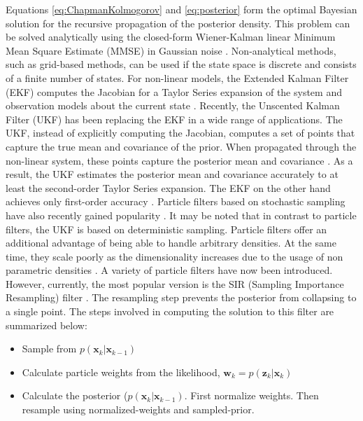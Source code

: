 \documentclass[12pt,letterpaper,doublespaced,ETD,proposal]{gt-ece-thesis}
\begin{document}
\begin{Body}
Equations \ref{eq:ChapmanKolmogorov} and \ref{eq:posterior} form the optimal Bayesian solution for the recursive propagation of the posterior density.  This problem can be solved analytically using the closed-form Wiener-Kalman linear Minimum Mean Square Estimate (MMSE) in Gaussian noise \cite{1964_JNL_BayesianEstimation_Ho, 1993_BOOK_SSP_Kay}.  Non-analytical methods, such as grid-based methods, can be used if the state space is discrete and consists of a finite number of states.  For non-linear models, the Extended Kalman Filter (EKF) computes the Jacobian for a Taylor Series expansion of the system and observation models about the current state \cite{2005_Misc_KalmanFilterComparison_Orderud}.  Recently, the Unscented Kalman Filter (UKF) has been replacing the EKF in a wide range of applications.  The UKF, instead of explicitly computing the Jacobian, computes a set of points that capture the true mean and covariance of the prior.  When propagated through the non-linear system, these points capture the posterior mean and covariance \cite{1997_CNF_UKF_Julier}.  As a result, the UKF estimates the posterior mean and covariance accurately to at least the second-order Taylor Series expansion.  The EKF on the other hand achieves only first-order accuracy \cite{2004_CNF_SigmaPointKalman_Merwe, 2000_CNF_UKF_Wan}.  Particle filters based on stochastic sampling have also recently gained popularity \cite{1993_JNL_ParticleFilter_Gordon, 2001_JNL_PFjumpMarkov_Doucet}.  It may be noted that in contrast to particle filters, the UKF is based on deterministic sampling.  Particle filters offer an additional advantage of being able to handle arbitrary densities.  At the same time, they scale poorly as the dimensionality increases due to the usage of non parametric densities \cite{2004_CNF_TrackingPeople_Zhao}.  A variety of particle filters have now been introduced.  However, currently, the most popular version is the SIR (Sampling Importance Resampling) filter \cite{2009_BOOK_PF_Doucet}.  The resampling step prevents the posterior from collapsing to a single point.  The steps involved in computing the solution to this filter are summarized below:

\begin{itemize}
\item Sample from $p(\mathbf{x}_k | \mathbf{x}_{k-1})$
\item Calculate particle weights from the likelihood, $\mathbf{w}_k = p(\mathbf{z}_k|\mathbf{x}_k)$
\item Calculate the posterior ($p(\mathbf{x}_k | \mathbf{x}_{k-1})$.  First normalize weights.  Then resample using normalized-weights and sampled-prior. 
\end{itemize}


\end{Body}
\end{document}
